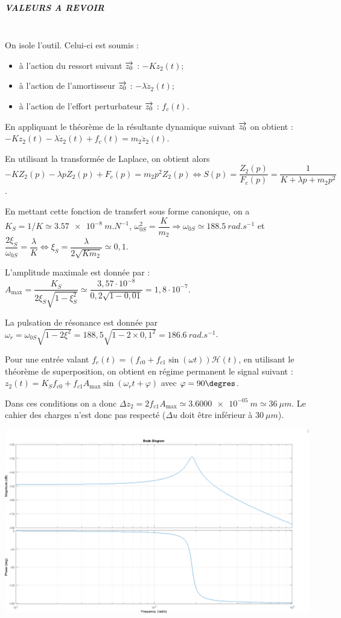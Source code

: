 \documentclass[10pt,fleqn]{article} %
\begin{document}
\subparagraph{VALEURS A REVOIR} %
~\\

On isole l'outil. Celui-ci est soumis :
\begin{itemize}
\item à l'action du ressort suivant $\overrightarrow{z_0}$ : $-Kz_2(t)$;
\item à l'action de l'amortisseur $\overrightarrow{z_0}$ : $-\lambda \dot{z}_2(t)$;
\item à l'action de l'effort perturbateur $\overrightarrow{z_0}$ : $f_c(t)$. 
\end{itemize}

En appliquant le théorème de la résultante dynamique suivant $\overrightarrow{z_0}$ on obtient : $-Kz_2(t)-\lambda \dot{z}_2(t)+f_c(t)=m_2\ddot{z}_2(t)$.

En utilisant la transformée de Laplace, on obtient alors 
$-KZ_2(p)-\lambda p{Z}_2(p)+F_c(p)=m_2p^2{Z}_2(p) \Leftrightarrow S(p)=\dfrac{Z_2(p)}{F_c(p)}=\dfrac{1}{K+\lambda p  + m_2 p^2}
$.

En mettant cette fonction de transfert sous forme canonique, on a 
$K_S =1/K \simeq \SI{3,57e-8}{m.N^{-1}}$, 
$\omega_{0S}^2 = \dfrac{K}{m_2} \Rightarrow \omega_{0S}\simeq \SI{188,5}{rad.s^{-1}}$ et 
$\dfrac{2\xi_S}{\omega_{0S}} = \dfrac{\lambda}{K} \Leftrightarrow \xi_S = \dfrac{\lambda }{2\sqrt{Km_2}} \simeq 0,1$.

L'amplitude maximale est donnée par : $A_{\text{max}}=\dfrac{K_S}{2\xi_S\sqrt{1-\xi_S^2}}\simeq \dfrac{3,57\cdot 10^{-8}}{0,2\sqrt{1-0,01}}=1,8\cdot 10^{-7}$.



La pulsation de résonance est donnée par $\omega_r = \omega_{0S} \sqrt{1-2\xi^2} = 188,5\sqrt{1-2\times 0,1^2}=\SI{186,6}{rad.s^{-1}}$.



Pour une entrée valant $f_c(t)=\left(f_{c0}+f_{c1}\sin \left(\omega t\right)\right) \mathcal{H}(t)$, en utilisant le théorème de superposition, on obtient en régime permanent le signal suivant : 
$z_2(t)=K_S f_{c0}  + f_{c1} A_{\text{max}} \sin \left(\omega_r t+\varphi\right)$ avec $\varphi=90\degres$.

Dans ces conditions on a donc $\Delta z_2 = 2 f_{c1} A_{\text{max}}\simeq \SI{3.6000e-05}{m} \simeq \SI{36}{\mu m} $. Le cahier des charges n'est donc pas respecté ($\Delta u$ doit être inférieur à $\SI{30}{\mu m}$).
\begin{center}
\includegraphics[width=.8\linewidth]{images/fig_08}
\end{center}
\end{document}

